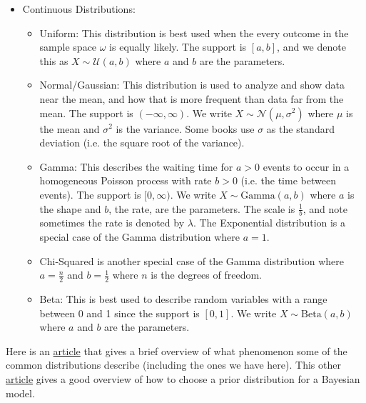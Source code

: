 \begin{itemize}
    \item Continuous Distributions:
    \begin{itemize}
        \item Uniform: This distribution is best used when the every outcome in the sample space $\omega$ is equally likely.
        The support is $[a,b]$, and we denote this as $X\sim\mathcal{U}(a,b)$ where $a$ and $b$ are the parameters.
        \item Normal/Gaussian: This distribution is used to analyze and show data near the mean, and how that is more frequent than data far from the mean.
        The support is $(-\infty,\infty)$. We write $X\sim\mathcal{N}(\mu,\sigma^2)$ where $\mu$ is the mean and $\sigma^2$ is the variance.
        Some books use $\sigma$ as the standard deviation (i.e. the square root of the variance).
        \item Gamma: This describes the waiting time for $a>0$ events to occur in a homogeneous Poisson process with rate $b>0$ (i.e. the time between events).
        The support is $[0,\infty)$.
        We write $X\sim\text{Gamma}(a,b)$ where $a$ is the shape and $b$, the rate, are the parameters.
        The scale is $\frac{1}{b}$, and note sometimes the rate is denoted by $\lambda$.
        The Exponential distribution is a special case of the Gamma distribution where $a=1$.
        \item Chi-Squared is another special case of the Gamma distribution where $a=\frac{n}{2}$ and $b=\frac{1}{2}$ where $n$ is the degrees of freedom.
        \item Beta: This is best used to describe random variables with a range between 0 and 1 since the support is $[0,1]$.
        We write $X\sim\text{Beta}(a,b)$ where $a$ and $b$ are the parameters.
    \end{itemize}
\end{itemize}

Here is an \href{https://medium.com/@ciortanmadalina/overview-of-data-distributions-87d95a5cbf0a}{article} that gives a brief overview of what phenomenon some of the common distributions describe (including the ones we have here).
This other \href{https://towardsdatascience.com/bayesian-ab-testing-part-iv-choosing-a-prior-5a4fe3223bfd}{article} gives a good overview of how to choose a prior distribution for a Bayesian model.

